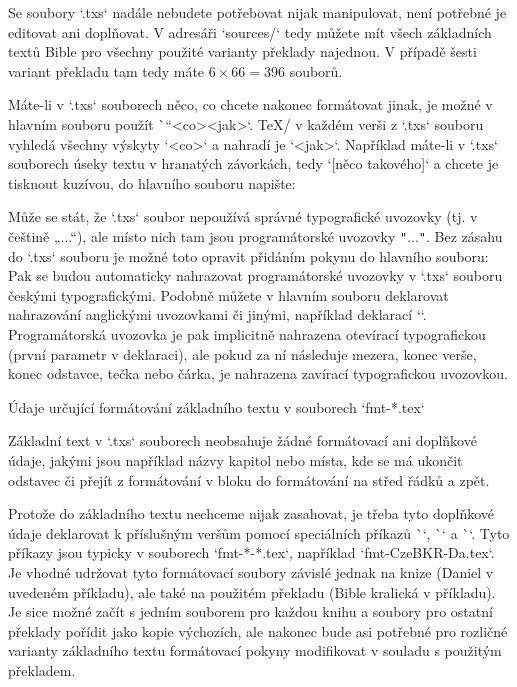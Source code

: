 Se soubory `.txs` nadále nebudete
potřebovat nijak manipulovat, není potřebné je editovat ani doplňovat. V
adresáři `sources/` tedy můžete mít  všech základních textů
Bible pro všechny použité varianty překlady najednou. V případě šesti variant
překladu tam tedy máte $6\times66=396$ souborů.

Máte-li v `.txs` souborech něco, co chcete nakonec formátovat jinak, je možné
v hlavním souboru použít \`\cnvtext``{<co>}{<jak>}`. \TeX/ v každém verši z
`.txs` souboru vyhledá všechny výskyty `<co>` a nahradí je `<jak>`.
Například máte-li v `.txs` souborech úseky textu v hranatých závorkách, tedy
`[něco takového]` a chcete je tisknout kuzívou, do hlavního souboru napište:
\begtt
\cnvtext{[}{\bgroup\it}  \cnvtext{]}{\/\egroup}
\endtt

Může se stát, že `.txs` soubor nepoužívá správné typografické uvozovky (tj. v
češtině „...“), ale místo nich tam jsou programátorské uvozovky {\tt"}...{\tt"}. 
Bez zásahu do `.txs` souboru je možné toto opravit přidáním pokynu do
hlavního souboru:
\begtt
{}
\endtt
Pak se budou automaticky nahrazovat programátorské uvozovky v `.txs` souboru českými
typografickými. Podobně můžete v hlavním souboru deklarovat nahrazování
anglickými uvozovkami či jinými, například deklarací
``.
Programátorská uvozovka je pak implicitně
nahrazena otevírací typografickou (první parametr v deklaraci), ale pokud za
ní následuje mezera, konec verše, konec odstavce, tečka nebo čárka, je
nahrazena zavírací typografickou uvozovkou.

\secc[fmt] Údaje určující formátování základního textu v souborech `fmt-*.tex`

Základní text v `.txs` souborech neobsahuje
žádné formátovací ani doplňkové údaje, jakými jsou například názvy kapitol
nebo místa, kde se má ukončit odstavec či přejít z formátování v bloku do
formátování na střed řádků a zpět.

Protože do základního textu nechceme nijak zasahovat, je třeba tyto doplňkové
údaje deklarovat k příslušným veršům pomocí speciálních příkazů \`\fmtadd`,
\`\fmtpre` a \`\fmtins`. Tyto příkazy jsou typicky v souborech `fmt-*-*.tex`,
například `fmt-CzeBKR-Da.tex`. Je vhodné udržovat tyto formátovací soubory
závislé jednak na knize (Daniel v uvedeném příkladu), ale také na použitém
překladu (Bible kralická v příkladu). Je sice možné začít s jedním souborem
pro každou knihu a soubory pro ostatní překlady pořídit jako kopie výchozích,
ale nakonec bude asi potřebné pro rozličné varianty základního textu
formátovací pokyny modifikovat v souladu s použitým překladem.




